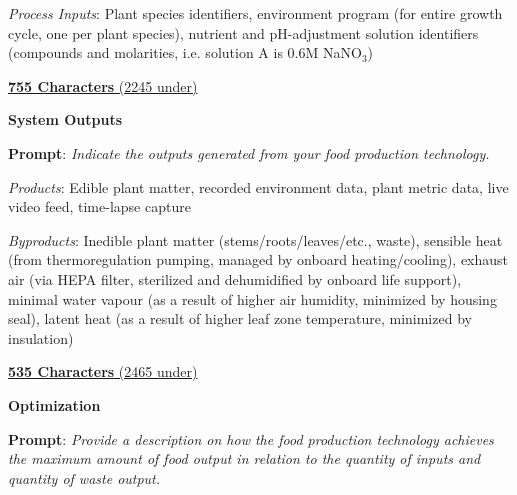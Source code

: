 \documentclass{report}
\begin{document}
\textit{Process Inputs}: Plant species identifiers, environment program (for entire growth cycle, one per plant species), nutrient and pH-adjustment solution identifiers (compounds and molarities, i.e. solution A is 0.6M NaNO${}_3$)

\uline{\textbf{755 Characters} (2245 under)}

\vspace{0.5cm}

\textbf{System Outputs}
\label{sec:resource-outputs}

\textbf{Prompt}: \textit{Indicate the outputs generated from your food production technology. }


\textit{Products}: Edible plant matter, recorded environment data, plant metric data, live video feed, time-lapse capture

\textit{Byproducts}: Inedible plant matter (stems/roots/leaves/etc., waste), sensible heat (from thermoregulation pumping, managed by onboard heating/cooling), exhaust air (via HEPA filter, sterilized and dehumidified by onboard life support), minimal water vapour (as a result of higher air humidity, minimized by housing seal), latent heat (as a result of higher leaf zone temperature, minimized by insulation)

\uline{\textbf{535 Characters} (2465 under)}

\newpage

\textbf{Optimization}
\label{sec:resource-optimization}

\textbf{Prompt}: \textit{Provide a description on how the food production technology achieves the maximum amount of food output in relation to the quantity of inputs and quantity of waste output.} 

\end{document}
